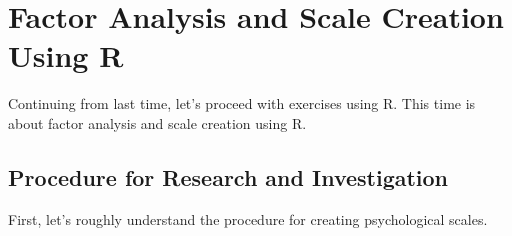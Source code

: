 \documentclass{ltjsbook}
\begin{document}
\chapter{Factor Analysis and Scale Creation Using R}
\label{x10_FA}
Continuing from last time, let's proceed with exercises using R. This time is about factor analysis and scale creation using R.

\section{Procedure for Research and Investigation}
First, let's roughly understand the procedure for creating psychological scales.

\end{document}
